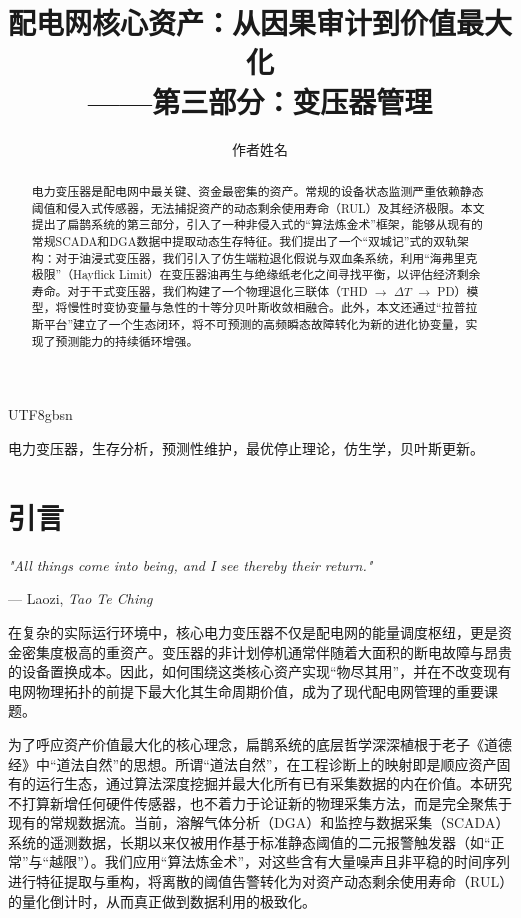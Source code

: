 \documentclass[journal]{IEEEtran}
\begin{document}
\begin{CJK*}{UTF8}{gbsn}

\title{配电网核心资产：从因果审计到价值最大化\\——第三部分：变压器管理}

\author{作者姓名 }

\maketitle

\begin{abstract}
电力变压器是配电网中最关键、资金最密集的资产。常规的设备状态监测严重依赖静态阈值和侵入式传感器，无法捕捉资产的动态剩余使用寿命（RUL）及其经济极限。本文提出了扁鹊系统的第三部分，引入了一种非侵入式的“算法炼金术”框架，能够从现有的常规SCADA和DGA数据中提取动态生存特征。我们提出了一个“双城记”式的双轨架构：对于油浸式变压器，我们引入了仿生端粒退化假说与双血条系统，利用“海弗里克极限”（Hayflick Limit）在变压器油再生与绝缘纸老化之间寻找平衡，以评估经济剩余寿命。对于干式变压器，我们构建了一个物理退化三联体（THD $\rightarrow$ $\Delta T$ $\rightarrow$ PD）模型，将慢性时变协变量与急性的十等分贝叶斯收敛相融合。此外，本文还通过“拉普拉斯平台”建立了一个生态闭环，将不可预测的高频瞬态故障转化为新的进化协变量，实现了预测能力的持续循环增强。
\end{abstract}

\begin{IEEEkeywords}
电力变压器，生存分析，预测性维护，最优停止理论，仿生学，贝叶斯更新。
\end{IEEEkeywords}

\section{引言}
\epigraph{\textit{"All things come into being, and I see thereby their return."}}{--- Laozi, \textit{Tao Te Ching}}
在复杂的实际运行环境中，核心电力变压器不仅是配电网的能量调度枢纽，更是资金密集度极高的重资产。变压器的非计划停机通常伴随着大面积的断电故障与昂贵的设备置换成本。因此，如何围绕这类核心资产实现“物尽其用”，并在不改变现有电网物理拓扑的前提下最大化其生命周期价值，成为了现代配电网管理的重要课题。

为了呼应资产价值最大化的核心理念，扁鹊系统的底层哲学深深植根于老子《道德经》中“道法自然”的思想。所谓“道法自然”，在工程诊断上的映射即是顺应资产固有的运行生态，通过算法深度挖掘并最大化所有已有采集数据的内在价值。本研究不打算新增任何硬件传感器，也不着力于论证新的物理采集方法，而是完全聚焦于现有的常规数据流。当前，溶解气体分析（DGA）和监控与数据采集（SCADA）系统的遥测数据，长期以来仅被用作基于标准静态阈值的二元报警触发器（如“正常”与“越限”）\cite{TODO_CITE_DGA_SCADA}。我们应用“算法炼金术”\cite{zeng2026llm}，对这些含有大量噪声且非平稳的时间序列进行特征提取与重构，将离散的阈值告警转化为对资产动态剩余使用寿命（RUL）的量化倒计时，从而真正做到数据利用的极致化。


\end{CJK*}
\end{document}

